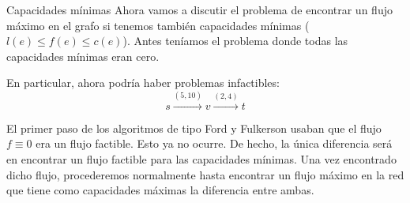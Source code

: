 \documentclass[8pt,xcolor={dvipsnames}]{beamer}
\begin{document}
	

	

\begin{frame}{Capacidades m\'inimas}
	Ahora vamos a discutir el problema de encontrar un flujo m\'aximo en el grafo si tenemos tambi\'en capacidades m\'inimas ($l(e) \leq f(e) \leq c(e)$). Antes ten\'iamos el problema donde todas las capacidades m\'inimas eran cero.
	
	En particular, ahora podr\'ia haber problemas infactibles:
	$$ s \overset{(5,10)}{\longrightarrow} v \overset{(2,4)}{\longrightarrow} t$$ 	
	\pause
	
	El primer paso de los algoritmos de tipo Ford y Fulkerson usaban que el flujo $f \equiv 0$ era un flujo factible. Esto ya no ocurre. De hecho, la \'unica diferencia ser\'a en encontrar un flujo factible para las capacidades m\'inimas. Una vez encontrado dicho flujo, procederemos normalmente hasta encontrar un flujo m\'aximo en la red que tiene como capacidades m\'aximas la diferencia entre ambas.
\end{frame}
\end{document}

